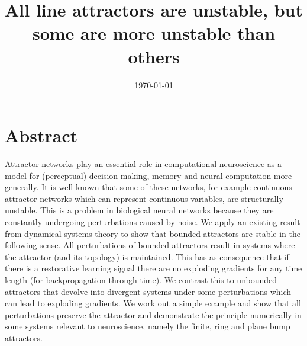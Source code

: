 \documentclass{article}
\title{All line attractors are unstable, but some are more unstable than others}
\date{\today}
\theoremstyle{definition}
\theoremstyle{remark}
\begin{document}
\maketitle

\section*{Abstract}

Attractor networks play an essential role in computational neuroscience as a model for (perceptual) decision-making, memory and neural computation more generally.
It is well known that some of these networks, for example continuous attractor networks which can represent continuous variables, are structurally unstable.
This is a problem in biological neural networks because they are constantly undergoing perturbations caused by noise. %
We apply an existing result from dynamical systems theory to show that bounded attractors are stable in the following sense.
All perturbations of bounded attractors result in systems where the attractor (and its topology) is maintained. This has as consequence that if there is a restorative learning signal there are no exploding gradients for any time length (for backpropagation through time).
We contrast this to unbounded attractors that devolve into divergent systems under some perturbations which can lead to exploding gradients.
We work out a simple example and show that all perturbations preserve the attractor
and demonstrate the principle numerically in some systems relevant to neuroscience, namely the finite, ring and plane bump attractors.




\end{document}
